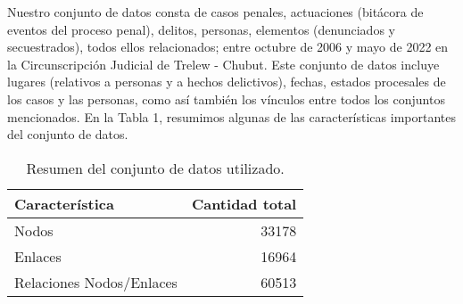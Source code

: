 Nuestro conjunto de datos consta de casos penales, actuaciones (bitácora de eventos del proceso penal), delitos, personas, elementos (denunciados y secuestrados), todos ellos relacionados; entre octubre de 2006 y mayo de 2022 en la Circunscripción Judicial de Trelew - Chubut. Este conjunto de datos incluye lugares (relativos a personas y a hechos delictivos), fechas, estados procesales de los casos y las personas, como así también los vínculos entre todos los conjuntos mencionados. En la Tabla 1, resumimos algunas de las características importantes del conjunto de datos.

\begin{table}
	\caption{Resumen del conjunto de datos utilizado.}\label{tab3}
	\centering
	\begin{tabular}{|l|r|}
		\hline
		\textbf{Característica} &  \textbf{Cantidad total} \\
		\hline
		Nodos &  33178 \\
		\hline
		Enlaces &  16964 \\
		\hline
		Relaciones Nodos/Enlaces &  60513 \\
		\hline
	\end{tabular}
\end{table}
